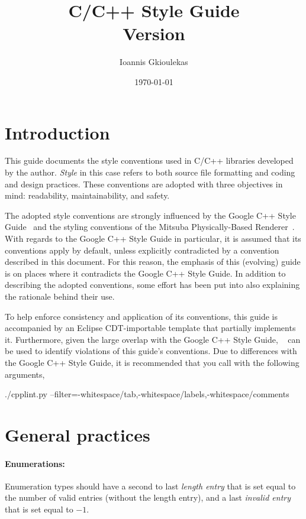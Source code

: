 \documentclass[footinclude=false,11pt,DIV11]{scrartcl}
\title{
	C/C++ Style Guide\\
	\LARGE Version \GuideVersion
}
\author{Ioannis Gkioulekas}
\date{\today}
\begin{document}
\maketitle

\tableofcontents


\section{Introduction}

This guide documents the style conventions used in C/C++ libraries developed
by the author. \emph{Style} in this case refers to both source file formatting and
coding and design practices. These conventions are adopted with three objectives in
mind: readability, maintainability, and safety.

The adopted style conventions are strongly influenced by the Google C++ Style
Guide~\cite{Google} and the styling conventions of the Mitsuba Physically-Based
Renderer~\cite{Mitsuba}. With regards to the Google C++ Style Guide in particular, it
is assumed that its conventions apply by default, unless explicitly contradicted by a
convention described in this document. For this reason, the emphasis of this (evolving)
guide is on places where it contradicts the Google C++ Style Guide. In addition to
describing the adopted conventions, some effort has been put into also explaining the
rationale behind their use.

To help enforce consistency and application of its conventions, this guide is
accompanied by an Eclipse CDT-importable template that partially implements it.
Furthermore, given the large overlap with the Google C++ Style Guide,
~\cite{cpplint} can be used to identify violations of this guide's
conventions. Due to differences with the Google C++ Style Guide, it is recommended that
you call  with the following arguments,
\begin{shell}
./cpplint.py --filter=-whitespace/tab,-whitespace/labels,-whitespace/comments
\end{shell}


\section{General practices}

\paragraph{Enumerations:} Enumeration types should have a second to last \emph{length
entry} that is set equal to the number of valid entries (without the length entry), and
a last \emph{invalid entry} that is set equal to $-1$.
\end{document}
